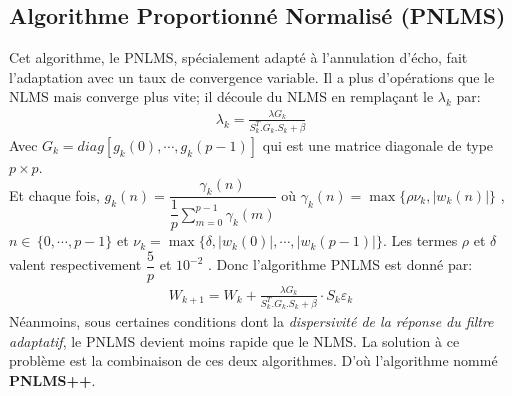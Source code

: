 \subsection{Algorithme Proportionné Normalisé (PNLMS)\cite{ThAlaedine}} \label{MatrGk}
Cet algorithme, le PNLMS, spécialement adapté à l'annulation d'écho, fait l'adaptation avec un taux de convergence variable. Il a plus d'opérations que le NLMS mais converge plus vite; il découle du NLMS en remplaçant le $ \lambda_{k} $ par:
\begin{eqnarray}
\lambda_{k} = \frac{\lambda G_{k}}{S_{k}^{T}.G_{k}.S_{k} + \beta}
\end{eqnarray}\newpage
Avec $ G_{k} = diag[g_{k}(0),\cdots ,g_{k}(p-1)] $ qui est une matrice diagonale de type $ p\times p $.\\
Et chaque fois, $ g_{k}(n) = \dfrac{\gamma_{k}(n)}{\dfrac{1}{p}\sum_{m=0}^{p-1}\gamma_{k}(m)} $ où $ \gamma_{k}(n) = \max\{\rho \nu_{k}, |w_{k}(n)|\} $ , $ n \in \, \{0,\cdots ,p-1\} $ et $ \nu_{k} = \max\{\delta,|w_{k}(0)|, \cdots ,|w_{k}(p-1)|\} $. Les termes $ \rho $ et $ \delta $ valent respectivement $ \dfrac{5}{p} $ et $ 10^{-2} $ . Donc l'algorithme PNLMS est donné par:
\begin{eqnarray}\label{AlgoPNLMS}
W_{k+1} = W_{k} + \frac{\lambda G_{k}}{S_{k}^{T}.G_{k}.S_{k} + \beta} \cdot S_{k}\varepsilon_{k}
\end{eqnarray}
Néanmoins, sous certaines conditions dont la \emph{dispersivité de la réponse du filtre adaptatif}, le PNLMS devient moins rapide que le NLMS. La solution à ce problème est la combinaison de ces deux algorithmes. D'où l'algorithme nommé \textbf{PNLMS++}.

